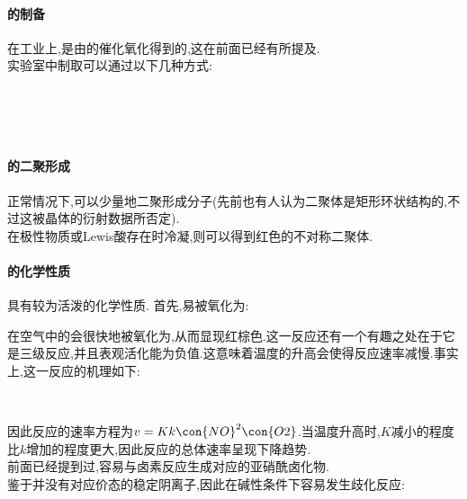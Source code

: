 \documentclass{ctexart}
\begin{document}
\paragraph{的制备}
在工业上,是由的催化氧化得到的,这在前面已经有所提及.\\
\indent 实验室中制取可以通过以下几种方式:
\begin{center}
    \\
    \\
    \\
\end{center}
\paragraph{的二聚形成}
正常情况下,可以少量地二聚形成分子(先前也有人认为二聚体是矩形环状结构的,不过这被晶体的衍射数据所否定).\\
\indent 在极性物质或Lewis酸存在时冷凝,则可以得到红色的不对称二聚体.
\paragraph{的化学性质}
具有较为活泼的化学性质.
\indent 首先,易被氧化为:
\begin{center}
\end{center}
在空气中的会很快地被氧化为,从而显现红棕色.这一反应还有一个有趣之处在于它是三级反应,并且表观活化能为负值.这意味着温度的升高会使得反应速率减慢.事实上,这一反应的机理如下:
\begin{center}
    \\
\end{center}
因此反应的速率方程为$v=Kk\con{NO}^2\con{O2}$.当温度升高时,$K$减小的程度比$k$增加的程度更大,因此反应的总体速率呈现下降趋势.\\
\indent 前面已经提到过,容易与卤素反应生成对应的亚硝酰卤化物.\\
\indent 鉴于并没有对应价态的稳定阴离子,因此在碱性条件下容易发生歧化反应:
\begin{center}
    \\
    \\
\end{center}
\end{document}
